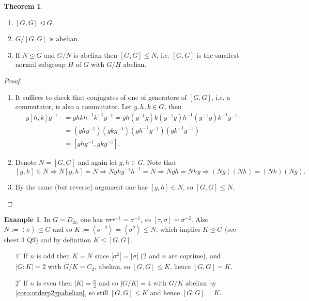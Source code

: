 \documentclass[a4paper]{article}
\newcommand{\la}{\left\langle}
\newcommand{\ra}{\right\rangle}
\theoremstyle{definition}
\newtheorem{thm}[defn]{Theorem}
\newtheorem{example}[defn]{Example}
\begin{document}
\begin{thm}
\label{thm:propofcommsubgp}
\begin{enumerate}
\item $[G,G]\unlhd G$.
\item $G/[G,G]$ is abelian.
\item If $N\unlhd G$ and $G/N$ is abelian then $[G,G]\leq N$, i.e. $[G,G]$ is the smallest normal subgroup $H$ of $G$ with $G/H$ abelian.
\end{enumerate}
\end{thm}
\begin{proof}
\begin{enumerate}
\item It suffices to check that conjugates of one of generators of $[G,G]$, i.e. a commutator, is also a commutator. Let $g,h,k\in G$, then
\[
\begin{aligned}
g[h,k]g^{-1}&=ghkh^{-1}k^{-1}g^{-1}=gh(g^{-1}g)k(g^{-1}g)h^{-1}(g^{-1}g)k^{-1}g^{-1}\\
&=(ghg^{-1})(gkg^{-1})(gh^{-1}g^{-1})(gk^{-1}g^{-1})\\
&=[ghg^{-1},gkg^{-1}].
\end{aligned}
\]
\item Denote $N=[G,G]$ and again let $g,h\in G$. Note that
\[
[g,h]\in N\Rightarrow N[g,h]=N\Rightarrow Nghg^{-1}h^{-1}=N\Rightarrow Ngh=Nhg\Rightarrow (Ng)(Nh)=(Nh)(Ng).
\]
\item By the same (but reverse) argument one has $[g,h]\in N$, so $[G,G]\leq N$.
\end{enumerate}
\end{proof}

\begin{example}
In $G=D_{2n}$ one has $\tau\sigma\tau^{-1}=\sigma^{-1}$, so $[\tau,\sigma]=\sigma^{-2}$. Also $N:=\la\sigma\ra\unlhd G$ and so $K:=\la\sigma^{-2}\ra=\la\sigma^2\ra\leq N$, which implies $K\unlhd G$ (see sheet 3 Q9) and by definition $K\leq [G,G]$.
\begin{enumerate}
\item[$1^\circ$] If $n$ is odd then $K=N$ since $|\sigma^2|=|\sigma|$ (2 and $n$ are coprime), and $|G:K|=2$ with $G/K=C_2$, abelian, so $[G,G]\leq K$, hence $[G,G]=K$.
\item[$2^\circ$] If $n$ is even then $|K|=\frac{n}{2}$ and so $|G/K|=4$ with $G/K$ abelian by \ref{coro:orderp2gpabelian}, so still $[G,G]\leq K$ and hence $[G,G]=K$.
\end{enumerate}
\end{example}
\end{document}
